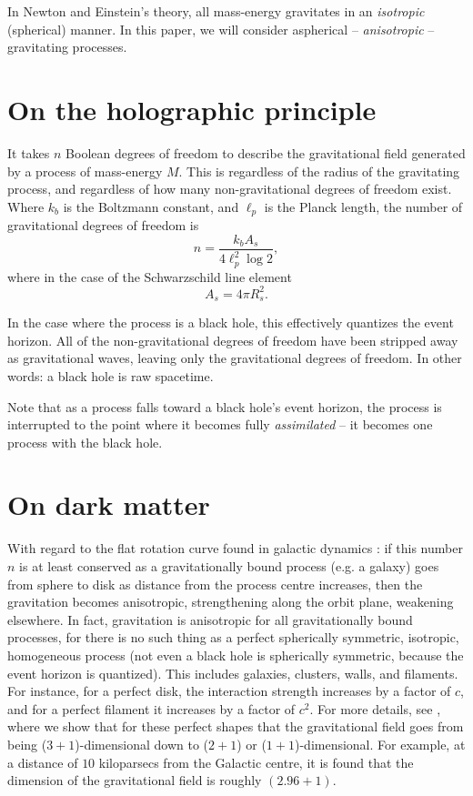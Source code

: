 \documentclass[12pt]{article}
\begin{document}
In Newton and Einstein's theory, all mass-energy gravitates in an {\textit{isotropic}} (spherical) manner.
In this paper, we will consider aspherical -- {\textit{anisotropic}} -- gravitating processes.






\section{On the holographic principle}

It takes $n$ Boolean degrees of freedom to describe the gravitational field \cite{hooft, susskind} generated by a process of mass-energy $M$.
This is regardless of the radius of the gravitating process, and regardless of how many non-gravitational degrees of freedom exist.
Where $k_b$ is the Boltzmann constant, and $\ell_p$ is the Planck length, the number of gravitational degrees of freedom is
\begin{equation}
n = \frac{k_b A_s}{4 \ell_p^2 \log 2},
\end{equation}
where in the case of the Schwarzschild line element
\begin{equation}
A_s = 4 \pi R_s^2.
\end{equation}

In the case where the process is a black hole, this effectively quantizes the event horizon.
All of the non-gravitational degrees of freedom have been stripped away as gravitational waves, leaving only the gravitational degrees of freedom.
In other words: a black hole is raw spacetime.

Note that as a process falls toward a black hole's event horizon, the process is interrupted to the point where it becomes fully {\textit{assimilated}} -- it becomes one process with the black hole.




\section{On dark matter}

With regard to the flat rotation curve found in galactic dynamics \cite{binney}: if this number $n$ is at least conserved as a gravitationally bound process (e.g. a galaxy) goes from sphere to disk as distance from the process centre increases, then the gravitation becomes anisotropic, strengthening along the orbit plane, weakening elsewhere.
In fact, gravitation is anisotropic for all gravitationally bound processes, for there is no such thing as a perfect spherically symmetric, isotropic, homogeneous process (not even a black hole is spherically symmetric, because the event horizon is quantized).
This includes galaxies, clusters, walls, and filaments.
For instance, for a perfect disk, the interaction strength increases by a factor of $c$, and for a perfect filament it increases by a factor of $c^2$.
For more details, see \cite{halayka}, where we show that for these perfect shapes that the gravitational field goes from being ($3+1$)-dimensional down to ($2+1$) or ($1+1$)-dimensional.
For example, at a distance of $10$ kiloparsecs from the Galactic centre, it is found that the dimension of the gravitational field is roughly $(2.96 + 1)$.
\end{document}

